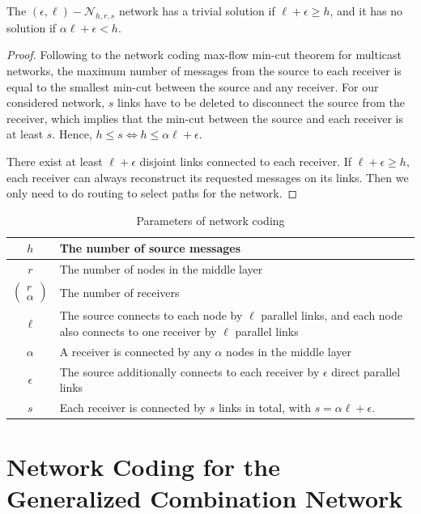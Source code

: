 \begin{thm}
\label{nw_parameters}The $(\epsilon,\ell)-\mathcal{N}_{h,r,s}$
network has a trivial solution if $\ell+\epsilon\geq h$, and it has
no solution if $\alpha\ell+\epsilon<h$.
\end{thm}
\begin{proof}
Following to the network coding max-flow min-cut theorem for multicast
networks, the maximum number of messages from the source to each receiver
is equal to the smallest min-cut between the source and any receiver.
For our considered network, $s$ links have to be deleted to disconnect
the source from the receiver, which implies that the min-cut between
the source and each receiver is at least $s$. Hence, $h\leq s\Leftrightarrow h\leq\alpha\ell+\epsilon$. 

There exist at least $\ell+\epsilon$ disjoint links connected to
each receiver. If $\ell+\epsilon\geq h$, each receiver can always
reconstruct its requested messages on its links. Then we only need
to do routing to select paths for the network.
\end{proof}
\begin{table}[H]
\caption{Parameters of network coding \label{tab:Parameters-of-network}}

\centering{}%
\begin{tabular}{|c|>{\centering}p{0.48\paperwidth}|}
\hline 
$h$ & The number of source messages\tabularnewline
\hline 
$r$ & The number of nodes in the middle layer\tabularnewline
\hline 
$\left(\begin{array}{c}
r\\
\alpha
\end{array}\right)$ & The number of receivers\tabularnewline
\hline 
$\ell$ & The source connects to each node by $\ell$ parallel links, and each
node also connects to one receiver by $\ell$ parallel links\tabularnewline
\hline 
$\alpha$ & A receiver is connected by any $\alpha$ nodes in the middle layer\tabularnewline
\hline 
$\epsilon$ & The source additionally connects to each receiver by $\epsilon$ direct
parallel links\tabularnewline
\hline 
$s$ & Each receiver is connected by $s$ links in total, with $s=\alpha\ell+\epsilon$.\tabularnewline
\hline 
\end{tabular}
\end{table}


\section{Network Coding for the Generalized Combination Network \label{sec:Network-Coding-for-GCN}}

